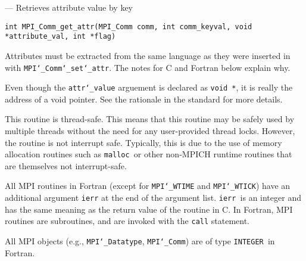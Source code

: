 \startmanpage
{}
--- Retrieves attribute value by key 
\startvb\begin{verbatim}
int MPI_Comm_get_attr(MPI_Comm comm, int comm_keyval, void *attribute_val, int *flag)

\end{verbatim}
\endvb

\par
{}
\par
{}
Attributes must be extracted from the same language as they were inserted
in with {\tt MPI{\tt \char`\_}Comm{\tt \char`\_}set{\tt \char`\_}attr}.  The notes for C and Fortran below explain
why.
\par
{}
Even though the {\tt attr{\tt \char`\_}value} arguement is declared as {\tt void *}, it is
really the address of a void pointer.  See the rationale in the
standard for more details.
\par
{}
\par
This routine is thread-safe.  This means that this routine may be
safely used by multiple threads without the need for any user-provided
thread locks.  However, the routine is not interrupt safe.  Typically,
this is due to the use of memory allocation routines such as {\tt malloc
}or other non-MPICH runtime routines that are themselves not interrupt-safe.
\par
{}
All MPI routines in Fortran (except for {\tt MPI{\tt \char`\_}WTIME} and {\tt MPI{\tt \char`\_}WTICK}) have
an additional argument {\tt ierr} at the end of the argument list.  {\tt ierr
}is an integer and has the same meaning as the return value of the routine
in C.  In Fortran, MPI routines are subroutines, and are invoked with the
{\tt call} statement.
\par
All MPI objects (e.g., {\tt MPI{\tt \char`\_}Datatype}, {\tt MPI{\tt \char`\_}Comm}) are of type {\tt INTEGER
}in Fortran.
\par
{}
\par
